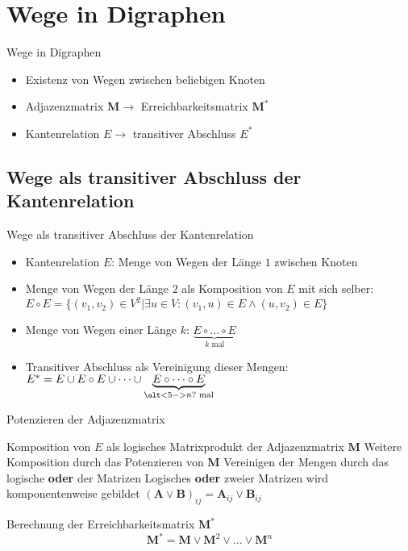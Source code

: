 \documentclass[mathserif]{beamer}
\begin{document}
\section{Wege in Digraphen}
\begin{frame}{Wege in Digraphen}
    \begin{itemize}
        \item Existenz von Wegen zwischen beliebigen Knoten\pause
        \item Adjazenzmatrix $\mathbf{M}\longrightarrow$ Erreichbarkeitsmatrix $\mathbf{M}^*$\pause
        \item Kantenrelation $E\longrightarrow$ transitiver Abschluss $E^*$
    \end{itemize}
\end{frame}
\subsection{Wege als transitiver Abschluss der Kantenrelation}
\begin{frame}{Wege als transitiver Abschluss der Kantenrelation}
    \begin{itemize}
        \item Kantenrelation $E$: Menge von Wegen der Länge $1$ zwischen Knoten\pause
        \item Menge von Wegen der Länge $2$ als Komposition von $E$ mit sich selber:\\$E\circ E=\{(v_1,v_2)\in V^2|\exists u\in V:(v_1,u)\in E\land(u,v_2)\in E\}$\pause
        \item Menge von Wegen einer Länge $k$: $\underbrace{E\circ\dots\circ E}_{k\text{ mal}}$\pause
        \item Transitiver Abschluss als Vereinigung dieser Mengen:\\$E^*=E\cup E\circ E\cup\dots\cup\underbrace{E\circ\dots\circ E}_{\alt<5->{n}{\text{?}}\text{ mal}}$
    \end{itemize}
\end{frame}
\begin{frame}{Potenzieren der Adjazenzmatrix}
    \begin{outline}
        \1 Komposition von $E$ als logisches Matrixprodukt der Adjazenzmatrix $\mathbf{M}$\pause
        \1 Weitere Komposition durch das Potenzieren von $\mathbf{M}$\pause
        \1 Vereinigen der Mengen durch das logische \textbf{oder} der Matrizen
        \1 Logisches \textbf{oder} zweier Matrizen wird komponentenweise gebildet
        \2 $(\mathbf{A}\lor\mathbf{B})_{ij}=\mathbf{A}_{ij}\lor\mathbf{B}_{ij}$
    \end{outline}
    \pause
    \begin{block}{Berechnung der Erreichbarkeitsmatrix $\mathbf{M}^*$}
        \[\mathbf{M}^*=\mathbf{M}\lor\mathbf{M}^2\lor\dots\lor\mathbf{M}^n\]
    \end{block}
\end{frame}
\end{document}
